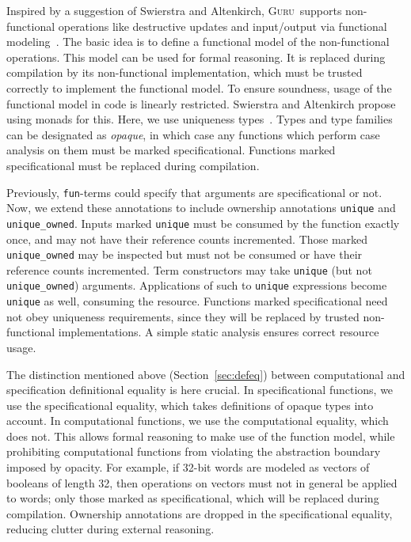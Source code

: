 \documentclass[preprint,natbib]{sigplanconf}
\newcommand{\guru}[0]{\textsc{Guru}}
\begin{document}
Inspired by a suggestion of Swierstra and Altenkirch, \guru\ supports
non-functional operations like destructive updates and input/output
via functional modeling~\cite{swierstra+07}.  The basic idea is to
define a functional model of the non-functional operations.  This
model can be used for formal reasoning.  It is replaced during
compilation by its non-functional implementation, which must be
trusted correctly to implement the functional model.  To ensure
soundness, usage of the functional model in code is linearly
restricted.  Swierstra and Altenkirch propose using monads for this.
Here, we use uniqueness types~\cite{barendsen+93}.  Types and type
families can be designated as \emph{opaque}, in which case any
functions which perform case analysis on them must be marked
specificational.  Functions marked specificational must be replaced
during compilation.

Previously, \texttt{fun}-terms could specify that arguments are
specificational or not.  Now, we extend these annotations to include
ownership annotations \texttt{unique} and \texttt{unique\_owned}.
Inputs marked \texttt{unique} must be consumed by the function exactly
once, and may not have their reference counts incremented.  Those
marked \texttt{unique\_owned} may be inspected but must not be
consumed or have their reference counts incremented.  Term
constructors may take \texttt{unique} (but not \texttt{unique\_owned})
arguments.  Applications of such to \texttt{unique} expressions become
\texttt{unique} as well, consuming the resource.  Functions marked
specificational need not obey uniqueness requirements, since they will
be replaced by trusted non-functional implementations.  A simple
static analysis ensures correct resource usage.

The distinction mentioned above (Section~\ref{sec:defeq}) between
computational and specification definitional equality is here crucial.
In specificational functions, we use the specificational equality,
which takes definitions of opaque types into account.  In
computational functions, we use the computational equality, which does
not.  This allows formal reasoning to make use of the function model,
while prohibiting computational functions from violating the
abstraction boundary imposed by opacity.  For example, if 32-bit words
are modeled as vectors of booleans of length 32, then operations on
vectors must not in general be applied to words; only those marked as
specificational, which will be replaced during compilation.  Ownership
annotations are dropped in the specificational equality, reducing
clutter during external reasoning.  
\end{document}
